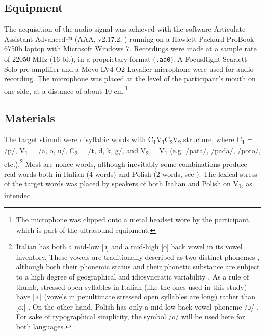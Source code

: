 \documentclass[preprint]{JASAnew}
\begin{document}
\hypertarget{equipment}{%
\subsection{Equipment}\label{equipment}}

The acquisition of the audio signal was achieved with the software
Articulate Assistant Advanced™ (AAA, v2.17.2, \citealt{articulate2011})
running on a Hawlett-Packard ProBook 6750b laptop with Microsoft Windows
7. Recordings were made at a sample rate of 22050 MHz (16-bit), in a
proprietary format (\texttt{.aa0}). A FocusRight Scarlett Solo
pre-amplifier and a Movo LV4-O2 Lavalier microphone were used for audio
recording. The microphone was placed at the level of the participant's
mouth on one side, at a distance of about 10
cm.\footnote{The microphone was clipped onto a metal headset wore by the participant, which is part of the ultrasound equipment.}

\hypertarget{materials}{%
\subsection{Materials}\label{materials}}

\label{s:materials}

The target stimuli were disyllabic words with
C\textsubscript{1}V\textsubscript{1}C\textsubscript{2}V\textsubscript{2}
structure, where C\textsubscript{1} = /p/, V\textsubscript{1} = /a, o,
u/, C\textsubscript{2} = /t, d, k, g/, and V\textsubscript{2} =
V\textsubscript{1} (e.g. /pata/, /pada/, /poto/,
etc.).\footnote{Italian has both a mid-low [ɔ] and a mid-high [o] back vowel in its vowel inventory. These vowels are traditionally described as two distinct phonemes \citep{kramer2009}, although both their phonemic status and their phonetic substance are subject to a high degree of geographical and idiosyncratic variability \citep{renwick2016}. As a rule of thumb, stressed open syllables in Italian (like the ones used in this study) have [ɔː] (vowels in penultimate stressed open syllables are long) rather than [oː] \citep{renwick2016}. On the other hand, Polish has only a mid-low back vowel phoneme /ɔ/ \citep{gussmann2007}. For sake of typographical simplicity, the symbol /o/ will be used here for both languages.}
Most are nonce words, although inevitably some combinations produce real
words both in Italian (4 words) and Polish (2 words, see
). The lexical stress of the target words was placed by
speakers of both Italian and Polish on V\textsubscript{1}, as intended.
\end{document}
